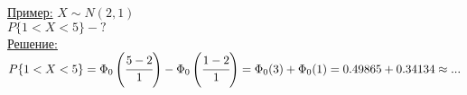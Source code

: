 \underline{Пример:} 
$X \sim N(2,1)$ \\
$P\{1 < X < 5\} - ?$ \\
\underline{Решение:} \\
$P\{1 < X < 5\} = \Phi_0 \left(\cfrac{5 - 2}{1}\right) - \Phi_0 \left(\cfrac{1 - 2}{1}\right) = \Phi_0(3) + \Phi_0(1) = 0.49865 + 0.34134 \approx ...$ 

























